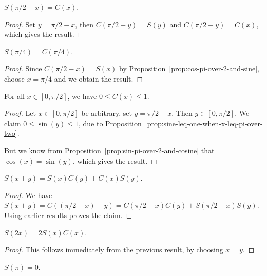 \begin{proposition}\label{prop:sin-pi-over-2-and-cosine}
$S(\pi/2 - x) = C(x)$.
\end{proposition}
\begin{proof}
Set $y = \pi/2 - x$, then $C(\pi/2 - y) = S(y)$ and $C(\pi/2 - y) = C(x)$,
which gives the result.
\end{proof}

\begin{proposition}\label{prop:sine-pi-over-four-equals-cosine-pi-over-four}
$S(\pi/4) = C(\pi/4)$.
\end{proposition}
\begin{proof}
  Since $C(\pi/2 - x) = S(x)$ by Proposition~\ref{prop:cos-pi-over-2-and-sine}, choose $x=\pi/4$ and we obtain the result.
\end{proof}

\begin{proposition}\label{prop:cosine-is-positive-on-0-to-pi-over-2}
For all $x\in[0,\pi/2]$, we have $0\leq C(x)\leq 1$.
\end{proposition}
\begin{proof}
  Let $x\in[0,\pi/2]$ be arbitrary, set $y=\pi/2-x$. Then $y\in[0,\pi/2]$.
  We claim $0\leq\sin(y)\leq 1$, due to Proposition~\ref{prop:sine-leq-one-when-x-leq-pi-over-two}.

  But we know from Proposition~\ref{prop:sin-pi-over-2-and-cosine} that
  $\cos(x)=\sin(y)$, which gives the result.
\end{proof}

\begin{proposition}\label{prop:sine-of-sum}
$S(x + y) = S(x)C(y) + C(x)S(y)$.
\end{proposition}
\begin{proof}
We have $S(x + y) = C((\pi/2 - x) - y) = C(\pi/2 - x)C(y) + S(\pi/2 - x)S(y)$.
Using earlier results proves the claim.
\end{proof}

\begin{proposition}\label{prop:double-angle-for-sine}
$S(2x) = 2S(x)C(x)$.
\end{proposition}

\begin{proof}
  This follows immediately from the previous result, by choosing $x=y$.
\end{proof}

\begin{proposition}
$S(\pi) = 0$.
\end{proposition}

